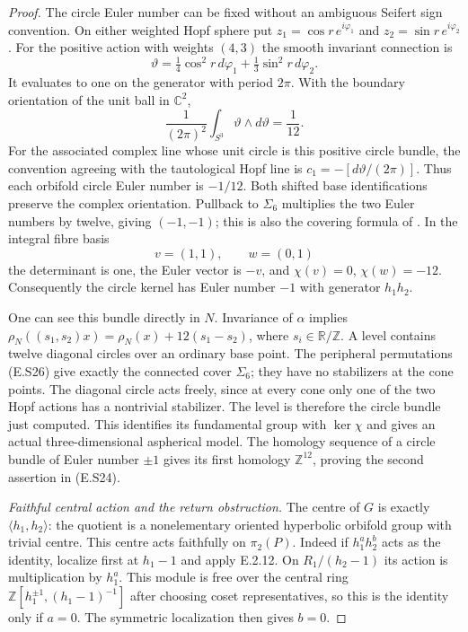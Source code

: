 \begin{proof}
The circle Euler number can be fixed without an ambiguous
Seifert sign convention. On either weighted Hopf sphere put
$z_1=\cos r\,e^{i\varphi_1}$ and
$z_2=\sin r\,e^{i\varphi_2}$. For the positive action with
weights $(4,3)$ the smooth invariant connection is
\[
 \vartheta=\tfrac14\cos^2r\,d\varphi_1
                    +\tfrac13\sin^2r\,d\varphi_2.
\]
It evaluates to one on the generator with period $2\pi$.
With the boundary orientation of the unit ball in $\mathbb C^2$,
\[
             \frac1{(2\pi)^2}\int_{S^3}\vartheta\wedge d\vartheta
                         =\frac1{12}.
 \tag{E.S28}
\]
For the associated complex line whose unit circle is this
positive circle bundle, the convention agreeing with the
tautological Hopf line is $c_1=-[d\vartheta/(2\pi)]$.
Thus each orbifold circle Euler number is $-1/12$.
Both shifted base identifications preserve the complex
orientation. Pullback to $\Sigma_6$ multiplies the two Euler
numbers by twelve, giving $(-1,-1)$; this is also the
covering formula of \cite[Theorem 3.6]{rootScott83}.
In the integral fibre basis
\[
                  v=(1,1),\qquad w=(0,1)
\]
the determinant is one, the Euler vector is $-v$, and
$\chi(v)=0$, $\chi(w)=-12$. Consequently the circle kernel
has Euler number $-1$ with generator $h_1h_2$.

One can see this bundle directly in $N$. Invariance of
$\alpha$ implies
$\rho_N((s_1,s_2)x)=\rho_N(x)+12(s_1-s_2)$, where
$s_i\in\mathbb R/\mathbb Z$. A level contains twelve
diagonal circles over an ordinary base point. The peripheral
permutations (E.S26) give exactly the connected cover
$\Sigma_6$; they have no stabilizers at the cone points.
The diagonal circle acts freely, since at every cone only
one of the two Hopf actions has a nontrivial stabilizer.
The level is therefore the circle bundle just computed.
This identifies its fundamental group with $\ker\chi$
and gives an actual three-dimensional aspherical model.
The homology sequence of a circle bundle of Euler number
$\pm1$ gives its first homology $\mathbb Z^{12}$, proving
the second assertion in (E.S24).

\emph{Faithful central action and the return obstruction.}
The centre of $G$ is exactly $\langle h_1,h_2\rangle$:
the quotient is a nonelementary oriented hyperbolic orbifold
group with trivial centre. This centre acts faithfully on
$\pi_2(P)$. Indeed if $h_1^a h_2^b$ acts as the identity,
localize first at $h_1-1$ and apply E.2.12. On
$R_1/(h_2-1)$ its action is multiplication by $h_1^a$.
This module is free over the central ring
$\mathbb Z[h_1^{\pm1},(h_1-1)^{-1}]$ after choosing coset
representatives, so this is the identity only if $a=0$.
The symmetric localization then gives $b=0$.


\end{proof}
